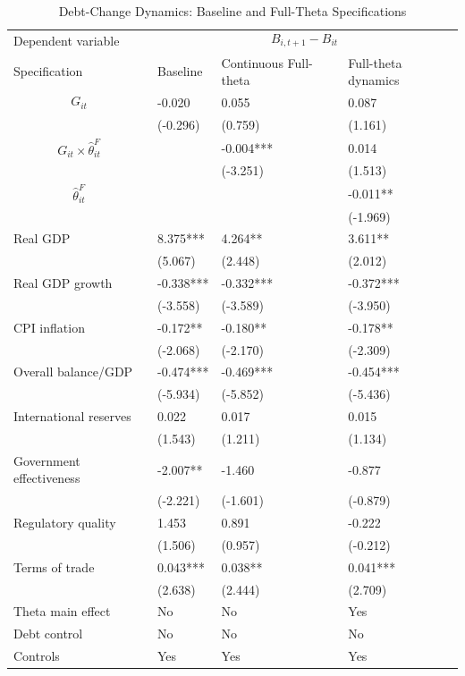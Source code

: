 \begin{table}[H]\centering
\begin{threeparttable}
\caption{Debt-Change Dynamics: Baseline and Full-Theta Specifications}
\label{tab:debt_change_combined_fulltheta}
\scriptsize
\begin{tabularx}{\textwidth}{lYYY}
\toprule
Dependent variable &  \\
\cmidrule(lr){2-4}
Specification & Baseline & Continuous Full-theta & Full-theta dynamics \\
\midrule
$$G_{it}$$ & -0.020 & 0.055 & 0.087 \\
 & (-0.296) & (0.759) & (1.161) \\
$$G_{it}\times\widehat{\theta}^{F}_{it}$$ &  & -0.004*** & 0.014 \\
 &  & (-3.251) & (1.513) \\
$$\widehat{\theta}^{F}_{it}$$ &  &  & -0.011** \\
 &  &  & (-1.969) \\
Real GDP & 8.375*** & 4.264** & 3.611** \\
 & (5.067) & (2.448) & (2.012) \\
Real GDP growth & -0.338*** & -0.332*** & -0.372*** \\
 & (-3.558) & (-3.589) & (-3.950) \\
CPI inflation & -0.172** & -0.180** & -0.178** \\
 & (-2.068) & (-2.170) & (-2.309) \\
Overall balance/GDP & -0.474*** & -0.469*** & -0.454*** \\
 & (-5.934) & (-5.852) & (-5.436) \\
International reserves & 0.022 & 0.017 & 0.015 \\
 & (1.543) & (1.211) & (1.134) \\
Government effectiveness & -2.007** & -1.460 & -0.877 \\
 & (-2.221) & (-1.601) & (-0.879) \\
Regulatory quality & 1.453 & 0.891 & -0.222 \\
 & (1.506) & (0.957) & (-0.212) \\
Terms of trade & 0.043*** & 0.038** & 0.041*** \\
 & (2.638) & (2.444) & (2.709) \\
\midrule
Theta main effect & No & No & Yes \\
Debt control & No & No & No \\
Controls & Yes & Yes & Yes \\

\end{tabularx}
\end{threeparttable}
\end{table}
